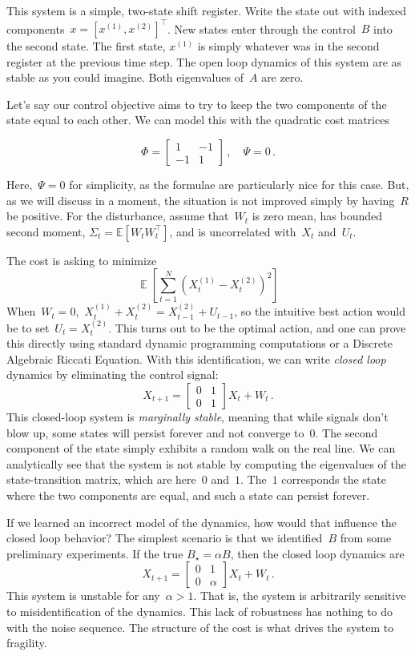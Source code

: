 \documentclass{tufte-book}
\begin{document}
This system is a simple, two-state shift register. Write the state out
with indexed components~\(x=[x^{(1)},x^{(2)}]^\top\). New states enter
through the control~\(B\) into the second state. The first state,
\(x^{(1)}\) is simply whatever was in the second register at the
previous time step. The open loop dynamics of this system are as stable
as you could imagine. Both eigenvalues of~\(A\) are zero.

Let's say our control objective aims to try to keep the two components
of the state equal to each other. We can model this with the quadratic
cost matrices

\[
    \Phi = \begin{bmatrix} 1 & -1 \\ -1 & 1 \end{bmatrix} \,, \quad \Psi = 0\,.
\]

Here,~\(\Psi=0\) for simplicity, as the formulae are particularly nice
for this case. But, as we will discuss in a moment, the situation is not
improved simply by having~\(R\) be positive. For the disturbance, assume
that~\(W_t\) is zero mean, has bounded second moment,
\(\Sigma_t = \mathbb{E}[W_t W_t^\top]\), and is uncorrelated
with~\(X_t\) and~\(U_t\).

The cost is asking to minimize \[
    \mathop\mathbb{E}\left[\sum_{t=1}^N (X_t^{(1)}-X_t^{(2)})^2\right]
\] When~\(W_t=0\),~\(X_t^{(1)}+X_t^{(2)} = X_{t-1}^{(2)}+U_{t-1}\), so
the intuitive best action would be to set~\(U_{t}=X_t^{(2)}\). This
turns out to be the optimal action, and one can prove this directly
using standard dynamic programming computations or a Discrete Algebraic
Riccati Equation. With this identification, we can write \emph{closed
loop} dynamics by eliminating the control signal: \[
    X_{t+1} = \begin{bmatrix} 0 & 1\\ 0 & 1 \end{bmatrix} X_t + W_t\,.
\] This closed-loop system is \emph{marginally stable}, meaning that
while signals don't blow up, some states will persist forever and not
converge to~\(0\). The second component of the state simply exhibits a
random walk on the real line. We can analytically see that the system is
not stable by computing the eigenvalues of the state-transition matrix,
which are here~\(0\) and~\(1\). The~\(1\) corresponds the state where
the two components are equal, and such a state can persist forever.

If we learned an incorrect model of the dynamics, how would that
influence the closed loop behavior? The simplest scenario is that we
identified~\(B\) from some preliminary experiments. If the true
\(B_\star=\alpha B\), then the closed loop dynamics are \[
    X_{t+1} = \begin{bmatrix} 0 & 1\\ 0 &\alpha \end{bmatrix} X_t + W_t\,.
\] This system is unstable for any~\(\alpha>1\). That is, the system is
arbitrarily sensitive to misidentification of the dynamics. This lack of
robustness has nothing to do with the noise sequence. The structure of
the cost is what drives the system to fragility.
\end{document}
